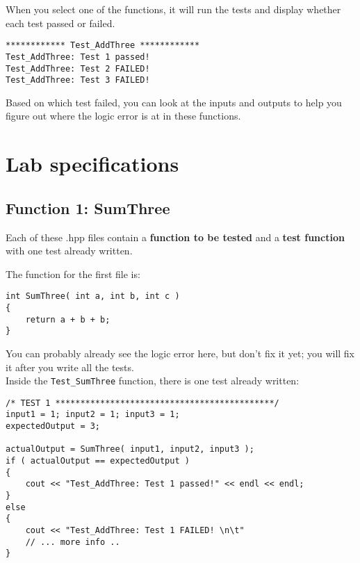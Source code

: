 When you select one of the functions, it will run the tests and display
whether each test passed or failed.

\begin{lstlisting}[style=output]
************ Test_AddThree ************
Test_AddThree: Test 1 passed!
Test_AddThree: Test 2 FAILED!
Test_AddThree: Test 3 FAILED!
\end{lstlisting}

Based on which test failed, you can look at the inputs and outputs
to help you figure out where the logic error is at in these functions.

\hrulefill


\section{Lab specifications}

\subsection{Function 1: SumThree}

Each of these .hpp files contain a \textbf{function to be tested} and a
\textbf{test function} with one test already written.

The function for the first file is:

\begin{lstlisting}[style=code]
int SumThree( int a, int b, int c )
{
    return a + b + b;
}
\end{lstlisting}

You can probably already see the logic error here, but don't fix it yet;
you will fix it after you write all the tests.
~\\

Inside the \texttt{Test\_SumThree} function, there is one test already written:

\begin{lstlisting}[style=code]
/* TEST 1 ********************************************/
input1 = 1; input2 = 1; input3 = 1;
expectedOutput = 3;

actualOutput = SumThree( input1, input2, input3 );
if ( actualOutput == expectedOutput )
{
    cout << "Test_AddThree: Test 1 passed!" << endl << endl;
}
else
{
    cout << "Test_AddThree: Test 1 FAILED! \n\t"
    // ... more info .. 
}
\end{lstlisting}

